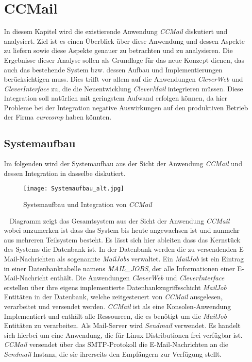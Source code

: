 \chapter{CCMail}
\label{cha:ccmail}
In diesem Kapitel wird die existierende Anwendung \emph{CCMail} diskutiert und analysiert. Ziel ist es einen Überblick über diese Anwendung und dessen Aspekte zu liefern sowie diese Aspekte genauer zu betrachten und zu analysieren. Die Ergebnisse dieser Analyse sollen als Grundlage für das neue Konzept dienen, das auch das bestehende System bzw. dessen Aufbau und Implementierungen berücksichtigen muss. Dies trifft vor allem auf die Anwendungen \emph{CleverWeb} und \emph{CleverInterface} zu, die die Neuentwicklung \emph{CleverMail} integrieren müssen. Diese Integration soll natürlich mit geringstem Aufwand erfolgen können, da hier Probleme bei der Integration negative Auswirkungen auf den produktiven Betrieb der Firma \emph{curecomp} haben könnten. 
\section{Systemaufbau}
\label{sec:systemaufbau}
Im folgenden wird der Systemaufbau aus der Sicht der Anwendung \emph{CCMail} und dessen Integration in dasselbe diskutiert. 
\begin{figure}[h]
\centering
\texttt{[image: Systemaufbau\_alt.jpg]} %
\caption{Systemaufbau und Integration von \emph{CCMail}}
\label{fig:ccmail-system-und-integration}
\end{figure}
\ \newpage
{} Diagramm zeigt das Gesamtsystem aus der Sicht der Anwendung \emph{CCMail} wobei anzumerken ist dass das System bis heute angewachsen ist und nunmehr aus mehreren Teilsystem besteht. Es lässt sich hier ableiten dass das Kernstück des Systems die Datenbank ist. In der Datenbank werden die zu versendenden E-Mail-Nachrichten als sogenannte \emph{MailJobs} verwaltet. Ein \emph{MailJob} ist ein Eintrag in einer Datenbanktabelle namens \emph{MAIL\_JOBS}, der alle Informationen einer E-Mail-Nachricht enthält.
\newline
\newline
Die Anwendungen \emph{CleverWeb} und \emph{CleverInterface} erstellen über ihre eigens implementierte Datenbankzugriffsschicht \emph{MailJob} Entitäten in der Datenbank, welche zeitgesteuert von \emph{CCMail} ausgelesen, verarbeitet und versendet werden. \emph{CCMail} ist als eine Konsolen-Anwendung Implementiert und enthält alle Ressourcen, die es benötigt um die \emph{MailJob} Entitäten zu verarbeiten.
\newline
\newline
Als Mail-Server wird \emph{Sendmail} verwendet. Es handelt sich hierbei um eine Anwendung, die für Linux Distributionen frei verfügbar ist. \emph{CCMail} versendet über das SMTP-Protokoll die E-Mail-Nachrichten an die \emph{Sendmail} Instanz, die sie ihrerseits den Empfängern zur Verfügung stellt.
\newpage
